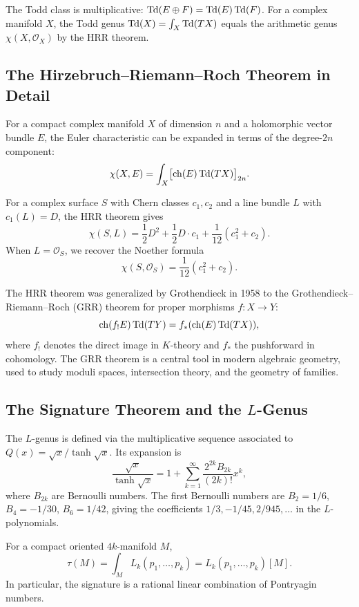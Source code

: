 The Todd class is multiplicative:
\(\operatorname{Td}(E \oplus F) = \operatorname{Td}(E) \operatorname{Td}(F)\). For a complex manifold \(X\), the
Todd genus \(\operatorname{Td}(X) = \int_X \operatorname{Td}(TX)\) equals the arithmetic genus
\(\chi(X, \mathcal{O}_X)\) by the HRR theorem.

\subsection{The Hirzebruch--Riemann--Roch Theorem in Detail}

For a compact complex manifold \(X\) of dimension \(n\) and a
holomorphic vector bundle \(E\), the Euler characteristic can be
expanded in terms of the degree-\(2n\) component:
\[
\chi(X, E) = \int_X \bigl[\operatorname{ch}(E) \operatorname{Td}(TX)\bigr]_{2n}.
\]

\begin{example}
For a complex surface \(S\) with Chern classes \(c_1, c_2\) and a line
bundle \(L\) with \(c_1(L) = D\), the HRR theorem gives
\[
\chi(S, L) = \frac12 D^2 + \frac12 D \cdot c_1
+ \frac1{12}(c_1^2 + c_2).
\]
When \(L = \mathcal{O}_S\), we recover the Noether formula
\[
\chi(S, \mathcal{O}_S) = \frac1{12}(c_1^2 + c_2).
\]
\end{example}

The HRR theorem was generalized by Grothendieck in 1958 to the
Grothendieck--Riemann--Roch (GRR) theorem for proper morphisms
\(f: X \to Y\):
\[
\operatorname{ch}(f_! E) \operatorname{Td}(TY) = f_*(\operatorname{ch}(E) \operatorname{Td}(TX)),
\]
where \(f_!\) denotes the direct image in \(K\)-theory and \(f_*\) the
pushforward in cohomology. The GRR theorem is a central tool in modern
algebraic geometry, used to study moduli spaces, intersection theory,
and the geometry of families.

\subsection{The Signature Theorem and the \texorpdfstring{\(L\)}{L}-Genus}

The \(L\)-genus is defined via the multiplicative sequence associated
to \(Q(x) = \sqrt{x}/\tanh\sqrt{x}\). Its expansion is
\[
\frac{\sqrt{x}}{\tanh\sqrt{x}}
= 1 + \sum_{k=1}^\infty \frac{2^{2k} B_{2k}}{(2k)!} x^k,
\]
where \(B_{2k}\) are Bernoulli numbers. The first Bernoulli numbers are
\(B_2 = 1/6\), \(B_4 = -1/30\), \(B_6 = 1/42\), giving the coefficients
\(1/3, -1/45, 2/945, \dots\) in the \(L\)-polynomials.

\begin{theorem}
For a compact oriented \(4k\)-manifold \(M\),
\[
\tau(M) = \int_M L_k(p_1, \dots, p_k)
= L_k(p_1, \dots, p_k)[M].
\]
In particular, the signature is a rational linear combination of
Pontryagin numbers.
\end{theorem}

